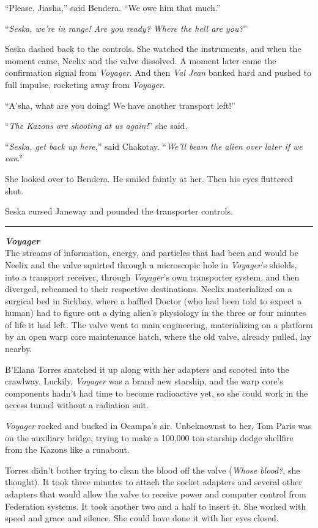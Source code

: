 \documentclass[twoside,letterpaper,12pt]{memoir}
\begin{document}
``Please, Jiasha,'' said Bendera. ``We owe him that much.''

``\textit{Seska, we're in range! Are you ready? Where the hell are you?}''

Seska dashed back to the controls. She watched the instruments, and when the moment came, Neelix and the valve dissolved. A moment later came the confirmation signal from \textit{Voyager}. And then \textit{Val Jean} banked hard and pushed to full impulse, rocketing away from \textit{Voyager}.

``A'sha, what are you doing! We have another transport left!''

``\textit{The Kazons are shooting at us again!}'' she said.

``\textit{Seska, get back up here},'' said Chakotay. ``\textit{We'll beam the alien over later if we can}.''

She looked over to Bendera. He smiled faintly at her. Then his eyes fluttered shut.

Seska cursed Janeway and pounded the transporter controls.

\fancybreak{\rule{3cm}{0.4 pt}}
\noindent\textit{\textbf{Voyager}}\\

The streams of information, energy, and particles that had been and would be Neelix and the valve squirted through a microscopic hole in \textit{Voyager}'s shields, into a transport receiver, through \textit{Voyager}'s own transporter system, and then diverged, rebeamed to their respective destinations. Neelix materialized on a surgical bed in Sickbay, where a baffled Doctor (who had been told to expect a human) had to figure out a dying alien's physiology in the three or four minutes of life it had left. The valve went to main engineering, materializing on a platform by an open warp core maintenance hatch, where the old valve, already pulled, lay nearby.

B'Elana Torres snatched it up along with her adapters and scooted into the crawlway. Luckily, \textit{Voyager} was a brand new starship, and the warp core's components hadn't had time to become radioactive yet, so she could work in the access tunnel without a radiation suit.

\textit{Voyager} rocked and bucked in Ocampa's air. Unbeknownst to her, Tom Paris was on the auxiliary bridge, trying to make a 100,000 ton starship dodge shellfire from the Kazons like a runabout.

Torres didn't bother trying to clean the blood off the valve (\textit{Whose blood?}, she thought). It took three minutes to attach the socket adapters and several other adapters that would allow the valve to receive power and computer control from Federation systems. It took another two and a half to insert it. She worked with speed and grace and silence. She could have done it with her eyes closed.
\end{document}
